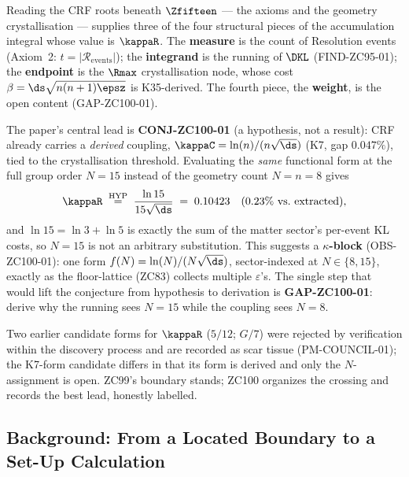 \documentclass[12pt, a4paper]{article}
\begin{document}
Reading the CRF roots beneath $\Zfifteen$ --- the axioms and the geometry
crystallisation --- supplies three of the four structural pieces of the
accumulation integral whose value is $\kappaR$. The \textbf{measure} is the
count of Resolution events (Axiom~2: $t=|\mathcal{R}_{\mathrm{events}}|$); the
\textbf{integrand} is the running of $\DKL$ (FIND-ZC95-01); the \textbf{endpoint}
is the $\Rmax$ crystallisation node, whose cost $\beta=\ds\sqrt{n(n+1)\epsz}$ is
K35-derived. The fourth piece, the \textbf{weight}, is the open content
(GAP-ZC100-01).

The paper's central lead is \textbf{CONJ-ZC100-01} (a hypothesis, not a result):
CRF already carries a \emph{derived} coupling, $\kappaC=\ln(n)/(n\sqrt{\ds})$
(K7, gap $0.047\%$), tied to the crystallisation threshold. Evaluating the
\emph{same} functional form at the full group order $N=15$ instead of the
geometry count $N=n=8$ gives
\[
  \kappaR \;\stackrel{\mathrm{HYP}}{=}\; \frac{\ln 15}{15\sqrt{\ds}}
  \;=\; 0.10423 \quad (0.23\%\ \text{vs.\ extracted}),
\]
and $\ln 15=\ln 3+\ln 5$ is exactly the sum of the matter sector's per-event KL
costs, so $N=15$ is not an arbitrary substitution. This suggests a
\textbf{$\kappa$-block} (OBS-ZC100-01): one form $f(N)=\ln(N)/(N\sqrt{\ds})$,
sector-indexed at $N\in\{8,15\}$, exactly as the floor-lattice (ZC83) collects
multiple $\varepsilon$'s. The single step that would lift the conjecture from
hypothesis to derivation is \textbf{GAP-ZC100-01}: derive why the running sees
$N=15$ while the coupling sees $N=8$.

Two earlier candidate forms for $\kappaR$ ($5/12$; $G/7$) were rejected by
verification within the discovery process and are recorded as scar tissue
(PM-COUNCIL-01); the K7-form candidate differs in that its form is derived and
only the $N$-assignment is open. ZC99's boundary stands; ZC100 organizes the
crossing and records the best lead, honestly labelled.


\subsection{Background: From a Located Boundary to a Set-Up Calculation}
\label{sec:background-zc100}
\end{document}
